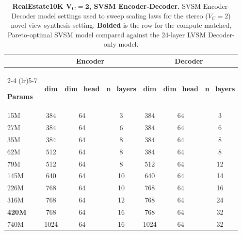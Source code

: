 \begin{table}[t]
\centering
\begin{threeparttable}
\footnotesize            %
\setlength{\tabcolsep}{4pt}  %

\begin{tabular}{lcccccc}   %
\toprule

& \multicolumn{3}{c}{\textbf{Encoder}}
& \multicolumn{3}{c}{\textbf{Decoder}} \\
\cmidrule(lr){2-4} \cmidrule(lr){5-7}

\textbf{Params}
& \textbf{dim} & \textbf{dim\_head} & \textbf{n\_layers}
& \textbf{dim} & \textbf{dim\_head} & \textbf{n\_layers} \\
\midrule


15M & 384 & 64 & 3 & 384 & 64 & 3 \\
27M & 384 & 64 & 6 & 384 & 64 & 6 \\
35M & 384 & 64 & 8 & 384 & 64 & 8 \\
62M & 512 & 64 & 8 & 384 & 64 & 8 \\
79M & 512 & 64 & 8 & 512 & 64 & 12 \\
145M & 640 & 64 & 10 & 640 & 64 & 14 \\
226M & 768 & 64 & 10 & 768 & 64 & 16 \\
316M & 768 & 64 & 12 & 768 & 64 & 24 \\
\hline
\textbf{420M} & 768 & 64 & 16 & 768 & 64 & 32 \\
740M & 1024 & 64 & 16 & 1024 & 64 & 32 \\


\bottomrule
\end{tabular}

\caption{\textbf{RealEstate10K $\boldsymbol{V_C}\mathbf{{=}2}$, SVSM Encoder-Decoder.} SVSM Encoder-Decoder model settings used to sweep scaling laws for the stereo ($V_C{=} 2$) novel view synthesis setting. \textbf{Bolded} is the row for the compute-matched, Pareto-optimal SVSM model compared against the 24-layer LVSM Decoder-only model.}
\label{tab:svsm-re10k-details}
\end{threeparttable}
\end{table}